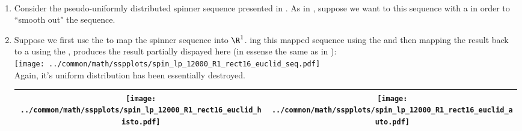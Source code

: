 \begin{example}
\label{ex:spin_lp}
\mbox{}\\
\begin{enumerate}
  \item \label{item:spin_lp_seq}
     Consider the pseudo-uniformly distributed spinner sequence presented in .
     As in , suppose we want to  this sequence with a
      in order to ``smooth out" the sequence.

  \item \label{item:spin_lp_R1_rect16_euclid}
        Suppose we first use the   
        to map the spinner sequence into $\R^1$.
        ing this mapped sequence using the  
        and then mapping the result back to a  %
        using the , produces the result partially dispayed here 
        (in essense the same as in ):
        \\\texttt{[image: ../common/math/sspplots/spin\_lp\_12000\_R1\_rect16\_euclid\_seq.pdf]}\\
        Again, it's uniform distribution has been essentially destroyed.
        \\\begin{tabular}{|>{\scs}c|>{\scs}c|}
             \hline
             \texttt{[image: ../common/math/sspplots/spin\_lp\_12000\_R1\_rect16\_euclid\_histo.pdf]}%
            &\texttt{[image: ../common/math/sspplots/spin\_lp\_12000\_R1\_rect16\_euclid\_auto.pdf]}
           \\\hline
        \end{tabular}



\end{enumerate}
\end{example}
